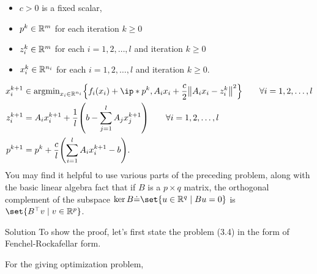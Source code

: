 \documentclass{article}
\begin{document}
\begin{problem}
\begin{enumerate}[(a)]
        \begin{itemize}
            \item $c>0$ is a fixed scalar,
            \item $p^k\in\mathbb{R}^m$ for each iteration $k\geq 0$
            \item $z_i^k\in\mathbb{R}^m$ for each $i=1,2,\ldots,l$ and iteration $k\geq 0$
            \item $x_i^k\in\mathbb{R}^{n_i}$ for each $i=1,2,\ldots,l$ and iteration $k\geq 0$.
        \end{itemize}
        \begin{align*}
            x_i^{k+1} &\in \argmin_{x_i\in\R^{n_i}}\braces*{f_i(x_i)+\ip*{p^k,A_ix_i}+\frac{c}{2}\norm*{A_ix_i-z_i^k}^2} \qquad \forall i=1,2,\ldots,l\\
            z_i^{k+1} &= A_ix_i^{k+1}+\frac{1}{l}\parens*{b-\sum_{j=1}^lA_jx_j^{k+1}} \qquad \forall i=1,2,\ldots,l \\
            p^{k+1} &= p^k+\frac{c}{l}\parens*{\sum_{i=1}^lA_ix_i^{k+1}-b}.
        \end{align*}
        You may find it helpful to use various parts of the preceding problem, along with the basic linear algebra fact that if $B$ is a $p\times q$ matrix, the orthogonal complement of the subspace $\ker B \dot{=}\set{u\in\R^q\mid Bu=0}$ is $\set{B^{\top}v\mid v\in\R^p}$.
    \end{enumerate}
\end{problem}

\begin{solution}
    {Solution}
    To show the proof, let's first state the problem (3.4) in the form of Fenchel-Rockafellar form.

    For the giving optimization problem, 
    
\end{solution}
\end{document}
